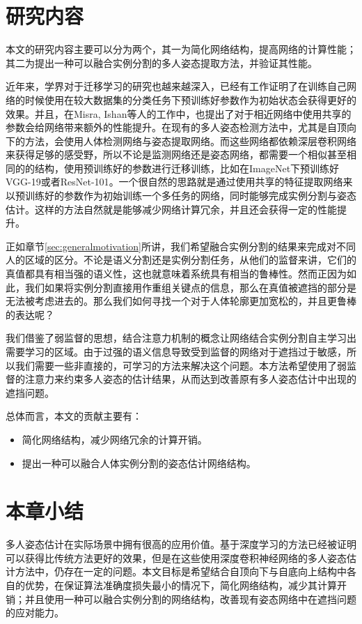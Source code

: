 \section{研究内容}
\label{sec:generalfield}
本文的研究内容主要可以分为两个，其一为简化网络结构，提高网络的计算性能；其二为提出一种可以融合实例分割的多人姿态提取方法，并验证其性能。

近年来，学界对于迁移学习的研究也越来越深入，已经有工作证明了在训练自己网络的时候使用在较大数据集的分类任务下预训练好参数作为初始状态会获得更好的效果\cite{mishkin2015all}。并且，在Misra, Ishan等人\cite{misra2016cross}的工作中，也提出了对于相近网络中使用共享的参数会给网络带来额外的性能提升。在现有的多人姿态检测方法中，尤其是自顶向下的方法，会使用人体检测网络与姿态提取网络。而这些网络都依赖深层卷积网络来获得足够的感受野，所以不论是监测网络还是姿态网络，都需要一个相似甚至相同的的结构，使用预训练好的参数进行迁移训练，比如在ImageNet\cite{deng2009imagenet}下预训练好VGG-19\cite{simonyan2014very}或者ResNet-101\cite{He2015Deep}。一个很自然的思路就是通过使用共享的特征提取网络来以预训练好的参数作为初始训练一个多任务的网络，同时能够完成实例分割与姿态估计。这样的方法自然就是能够减少网络计算冗余，并且还会获得一定的性能提升。

正如章节\ref{sec:generalmotivation}所讲，我们希望融合实例分割的结果来完成对不同人的区域的区分。不论是语义分割还是实例分割任务，从他们的监督来讲，它们的真值都具有相当强的语义性，这也就意味着系统具有相当的鲁棒性。然而正因为如此，我们如果将实例分割直接用作重组关键点的信息，那么在真值被遮挡的部分是无法被考虑进去的。那么我们如何寻找一个对于人体轮廓更加宽松的，并且更鲁棒的表达呢？

我们借鉴了弱监督的思想，结合注意力机制的概念让网络结合实例分割自主学习出需要学习的区域。由于过强的语义信息导致受到监督的网络对于遮挡过于敏感，所以我们需要一些非直接的，可学习的方法来解决这个问题。本方法希望使用了弱监督的注意力来约束多人姿态的估计结果，从而达到改善原有多人姿态估计中出现的遮挡问题。

总体而言，本文的贡献主要有：
\begin{itemize}
	\item 简化网络结构，减少网络冗余的计算开销。
	\item 提出一种可以融合人体实例分割的姿态估计网络结构。
\end{itemize}

\section{本章小结}
\label{sec:introconclusion}
多人姿态估计在实际场景中拥有很高的应用价值。基于深度学习的方法已经被证明可以获得比传统方法更好的效果，但是在这些使用深度卷积神经网络的多人姿态估计方法中，仍存在一定的问题。本文目标是希望结合自顶向下与自底向上结构中各自的优势，在保证算法准确度损失最小的情况下，简化网络结构，减少其计算开销；并且使用一种可以融合实例分割的网络结构，改善现有姿态网络中在遮挡问题的应对能力。